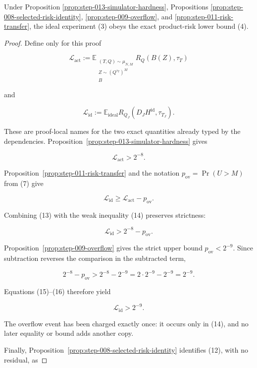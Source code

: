 \begin{proposition}\label{prop:step-013-product-lower-bound}
Under Proposition \ref{prop:step-013-simulator-hardness}, Propositions
\ref{prop:step-008-selected-risk-identity},
\ref{prop:step-009-overflow}, and
\ref{prop:step-011-risk-transfer}, the ideal experiment (3) obeys the exact
product-risk lower bound (4).
\end{proposition}

\begin{proof}
Define only for this proof

\[
\mathcal L_{\mathrm{act}}
:=
\mathbb E_{\substack{(T,Q)\sim\mu_{N,M}\\
                      Z\sim(Q^{\tau_T})^M\\ B}}
R_Q(B(Z),\tau_T)
\tag{11}
\]

and

\[
\mathcal L_{\mathrm{id}}
:=
\mathbb E_{\mathrm{ideal}}
R_{Q_J}(D_JH^{\mathrm{id}},\tau_{T_J}).
\tag{12}
\]

These are proof-local names for the two exact quantities already typed by
the dependencies. Proposition~\ref{prop:step-013-simulator-hardness}
gives

\[
\mathcal L_{\mathrm{act}}>2^{-8}.
\tag{13}
\]

Proposition~\ref{prop:step-011-risk-transfer} and the notation
\(p_{\mathrm{ov}}=\Pr(U>M)\) from (7) give

\[
\mathcal L_{\mathrm{id}}
\ge \mathcal L_{\mathrm{act}}-p_{\mathrm{ov}}.
\tag{14}
\]

Combining (13) with the weak inequality (14) preserves strictness:

\[
\mathcal L_{\mathrm{id}}
>2^{-8}-p_{\mathrm{ov}}.
\tag{15}
\]

Proposition~\ref{prop:step-009-overflow} gives the strict upper
bound \(p_{\mathrm{ov}}<2^{-9}\). Since subtraction reverses the comparison
in the subtracted term,

\[
2^{-8}-p_{\mathrm{ov}}
>2^{-8}-2^{-9}
=2\cdot2^{-9}-2^{-9}
=2^{-9}.
\tag{16}
\]

Equations (15)--(16) therefore yield

\[
\mathcal L_{\mathrm{id}}>2^{-9}.
\tag{17}
\]

The overflow event has been charged exactly once: it occurs only in (14),
and no later equality or bound adds another copy.

Finally, Proposition~\ref{prop:step-008-selected-risk-identity}
identifies (12), with no residual, as


\end{proof}
